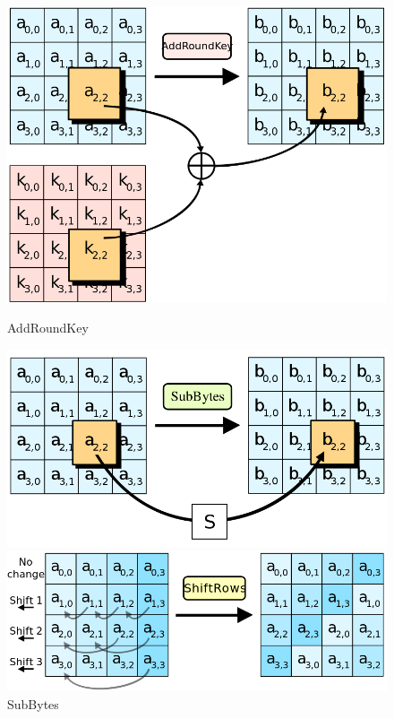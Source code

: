 \begin{figure}[!htp]
  \centering
  \begin{minipage}{.4\textwidth}
    \centering
    \includegraphics[width=\textwidth]{imagens/AddRoundKey.png}  
    \caption{AddRoundKey}
    \label{fig:add-round-key}
  \end{minipage}
 \begin{minipage}{.4\textwidth}
    \centering
    \includegraphics[width=\textwidth]{imagens/SubBytes.png}
    \caption{SubBytes}
    \label{fig:sub-bytes}
  \end{minipage}
  \begin{minipage}{.4\textwidth}
    \centering
    \includegraphics[width=\textwidth]{imagens/ShiftRows.png}  

\end{minipage}
\end{figure}
